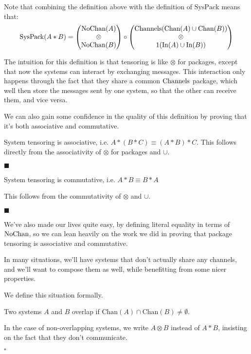 Note that combining the definition above with the definition of $\text{SysPack}$
means that:
$$
\text{SysPack}(A * B) =
\begin{pmatrix}
\text{NoChan}(A)\cr
\otimes\cr
\text{NoChan}(B)\cr
\end{pmatrix}
\circ
\begin{pmatrix}
\text{Channels}(\text{Chan}(A) \cup \text{Chan}(B))\cr
\otimes\cr
1(\text{In}(A) \cup \text{In}(B))\cr
\end{pmatrix}
$$

The intuition for this definition is that tensoring is like $\otimes$
for packages, except that now the systems can interact by exchanging
messages.
This interaction only happens through the fact that they
share a common $\text{Channels}$ package, which well then store
the messages sent by one system, so that the other can receive them,
and vice versa.

We can also gain some confidence in the quality of this definition
by proving that it's both associative and commutative.

\begin{lemma}
System tensoring is associative, i.e. $A * (B * C) \equiv (A * B) * C$.
 This follows directly from the associativity
of $\otimes$ for packages and $\cup$.

$\blacksquare$
\end{lemma}

\begin{lemma}
System tensoring is commutative, i.e. $A * B \equiv B * A$

 This follows from the commutativity of $\otimes$ and $\cup$.

$\blacksquare$
\end{lemma}

We've also made our lives quite easy, by defining literal
equality in terms of $\text{NoChan}$, so we can lean
heavily on the work we did in proving that package tensoring
is associative and commutative.

In many situations, we'll have systems that don't actually share
any channels, and we'll want to compose them as well, while
benefitting from some nicer properties.

We define this situation formally.

\begin{definition}
Two systems $A$ and $B$ overlap if $\text{Chan}(A) \cap \text{Chan}(B) \neq \emptyset$.

In the case of non-overlapping systems, we write $A \otimes B$ instead of $A * B$,
insisting on the fact that they don't communicate.

$\square$
\end{definition}


